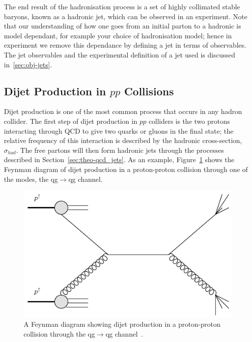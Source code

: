 The end result of the hadronisation process is a set of highly collimated stable baryons,
known as a hadronic jet, which can be observed in an experiment.
Note that our understanding of how one goes from an initial parton to a hadronic is model dependant,
for example your choice of hadronisation model;
hence in experiment we remove this dependance by defining a jet in terms of observables.
The jet observables and the experimental definition of a jet used is discussed in~\ref{sec:obj-jets}.


\subsection{Dijet Production in $pp$ Collisions}

Dijet production is one of the most common process that occurs in any hadron collider.
The first step of dijet production in $pp$ colliders is the two protons interacting through QCD to give two quarks or gluons in the final state;
the relative frequency of this interaction is described by the hadronic cross-section, $\sigma_{had}$.
The free partons will then form hadronic jets through the processes described in Section~\ref{sec:theo-qcd_jets}.
As an example, Figure~\ref{fig:theo-qcd_dijet_feynman} shows the Feynman diagram of
dijet production in a proton-proton collision through one of the modes, the qg$\to$qg channel.

\begin{figure}[!hbt]
  \begin{center}
    \includegraphics[width=0.7\linewidth, angle=0]{figs/Theory/qcd_dijet_feynman.png}
  \end{center}
  \caption[A Feynman diagram showing dijet production in a proton-proton collision through the qg$\to$qg channel.]
          {A Feynman diagram showing dijet production in a proton-proton collision through the qg$\to$qg channel~\cite{theo-qcd_dijet_feynman}.}
  \label{fig:theo-qcd_dijet_feynman}
\end{figure}

